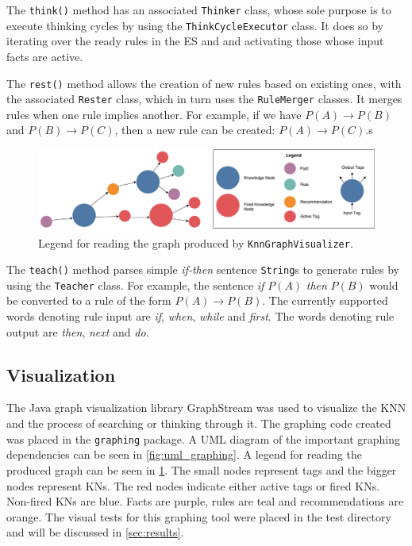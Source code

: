 \documentclass[titlepage,11pt]{article}
\newcommand{\code}[1]{\texttt{#1}}
\begin{document}
The \code{think()} method has an associated \code{Thinker} class, whose sole purpose is to execute thinking cycles by using the \code{ThinkCycleExecutor} class. It does so by iterating over the ready rules in the ES and and activating those whose input facts are active.

The \code{rest()} method allows the creation of new rules based on existing ones, with the associated \code{Rester} class, which in turn uses the \code{RuleMerger} classes. It merges rules when one rule implies another. For example, if we have $P(A) \rightarrow P(B)$ and $P(B) \rightarrow P(C)$, then a new rule can be created: $P(A) \rightarrow P(C)$.s

\begin{figure}[!htb]
	\includegraphics[width=\textwidth]{figures/knn_graph_legend.pdf}
	\caption{Legend for reading the graph produced by \code{KnnGraphVisualizer}.}
	\label{fig:knn_graph_legend}
\end{figure}

The \code{teach()} method parses simple \emph{if-then} sentence \code{String}s to generate rules by using the \code{Teacher} class. For example, the sentence \emph{if} $P(A)$ \emph{then} $P(B)$ would be converted to a rule of the form $P(A) \rightarrow P(B)$. The currently supported words denoting rule input are \emph{if}, \emph{when}, \emph{while} and \emph{first}. The words denoting rule output are \emph{then}, \emph{next} and \emph{do}.

\subsection{Visualization} \label{sec:impl_visualization}
The Java graph visualization library GraphStream was used to visualize the KNN and the process of searching or thinking through it. The graphing code created was placed in the \code{graphing} package. A UML diagram of the important graphing dependencies can be seen in \cref{fig:uml_graphing}. A legend for reading the produced graph can be seen in \cref{fig:knn_graph_legend}. The small nodes represent tags and the bigger nodes represent KNs. The red nodes indicate either active tags or fired KNs. Non-fired KNs are blue. Facts are purple, rules are teal and recommendations are orange. The visual tests for this graphing tool were placed in the test directory and will be discussed in \cref{sec:results}.
\end{document}
